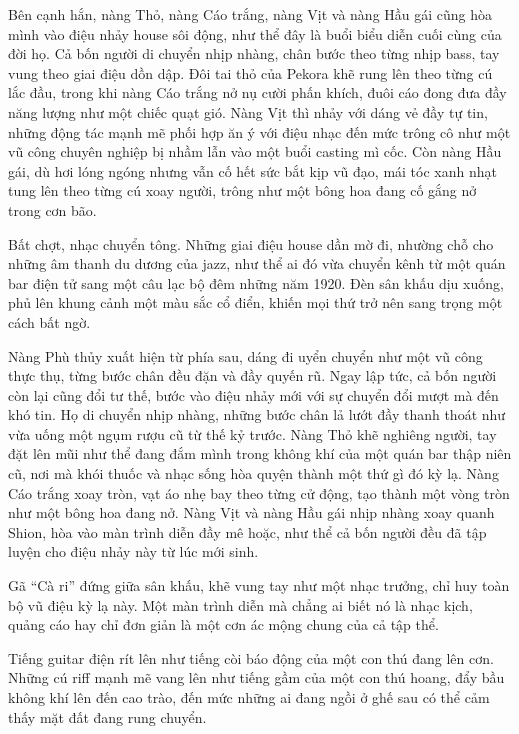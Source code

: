 \documentclass[../main.tex]{subfiles}
\begin{document}
Bên cạnh hắn, nàng Thỏ, nàng Cáo trắng, nàng Vịt và nàng Hầu gái cũng hòa mình vào điệu nhảy house sôi động, như thể đây là buổi biểu diễn cuối cùng của đời họ. Cả bốn người di chuyển nhịp nhàng, chân bước theo từng nhịp bass, tay vung theo giai điệu dồn dập. Đôi tai thỏ của Pekora khẽ rung lên theo từng cú lắc đầu, trong khi nàng Cáo trắng nở nụ cười phấn khích, đuôi cáo đong đưa đầy năng lượng như một chiếc quạt gió. Nàng Vịt thì nhảy với dáng vẻ đầy tự tin, những động tác mạnh mẽ phối hợp ăn ý với điệu nhạc đến mức trông cô như một vũ công chuyên nghiệp bị nhầm lẫn vào một buổi casting mì cốc. Còn nàng Hầu gái, dù hơi lóng ngóng nhưng vẫn cố hết sức bắt kịp vũ đạo, mái tóc xanh nhạt tung lên theo từng cú xoay người, trông như một bông hoa đang cố gắng nở trong cơn bão.

Bất chợt, nhạc chuyển tông. Những giai điệu house dần mờ đi, nhường chỗ cho những âm thanh du dương của jazz, như thể ai đó vừa chuyển kênh từ một quán bar điện tử sang một câu lạc bộ đêm những năm 1920. Đèn sân khấu dịu xuống, phủ lên khung cảnh một màu sắc cổ điển, khiến mọi thứ trở nên sang trọng một cách bất ngờ.

Nàng Phù thủy xuất hiện từ phía sau, dáng đi uyển chuyển như một vũ công thực thụ, từng bước chân đều đặn và đầy quyến rũ. Ngay lập tức, cả bốn người còn lại cũng đổi tư thế, bước vào điệu nhảy mới với sự chuyển đổi mượt mà đến khó tin. Họ di chuyển nhịp nhàng, những bước chân lả lướt đầy thanh thoát như vừa uống một ngụm rượu cũ từ thế kỷ trước. Nàng Thỏ khẽ nghiêng người, tay đặt lên mũi như thể đang đắm mình trong không khí của một quán bar thập niên cũ, nơi mà khói thuốc và nhạc sống hòa quyện thành một thứ gì đó kỳ lạ. Nàng Cáo trắng xoay tròn, vạt áo nhẹ bay theo từng cử động, tạo thành một vòng tròn như một bông hoa đang nở. Nàng Vịt và nàng Hầu gái nhịp nhàng xoay quanh Shion, hòa vào màn trình diễn đầy mê hoặc, như thể cả bốn người đều đã tập luyện cho điệu nhảy này từ lúc mới sinh.

Gã ``Cà ri'' đứng giữa sân khấu, khẽ vung tay như một nhạc trưởng, chỉ huy toàn bộ vũ điệu kỳ lạ này. Một màn trình diễn mà chẳng ai biết nó là nhạc kịch, quảng cáo hay chỉ đơn giản là một cơn ác mộng chung của cả tập thể.

\ct


Tiếng guitar điện rít lên như tiếng còi báo động của một con thú đang lên cơn. Những cú riff mạnh mẽ vang lên như tiếng gầm của một con thú hoang, đẩy bầu không khí lên đến cao trào, đến mức những ai đang ngồi ở ghế sau có thể cảm thấy mặt đất đang rung chuyển.
\end{document}
